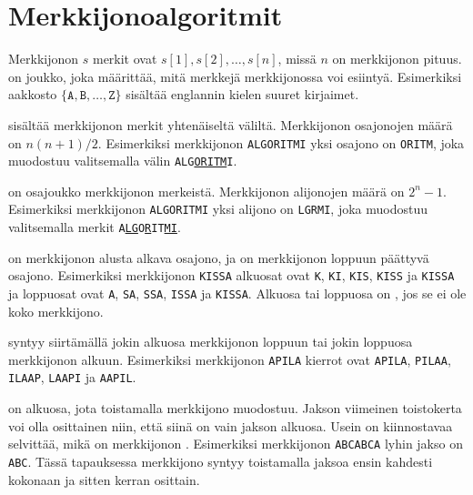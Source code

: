 \chapter{Merkkijonoalgoritmit}


Merkkijonon $s$ merkit ovat $s[1],s[2],\ldots,s[n]$,
missä $n$ on merkkijonon pituus.
 on joukko,
joka määrittää, mitä merkkejä merkkijonossa voi esiintyä.
Esimerkiksi aakkosto $\{\texttt{A},\texttt{B},\ldots,\texttt{Z}\}$
sisältää englannin kielen suuret kirjaimet.


sisältää merkkijonon merkit
yhtenäiseltä väliltä.
Merkkijonon osajonojen määrä on $n(n+1)/2$.
Esimerkiksi merkkijonon \texttt{ALGORITMI}
yksi osajono on \texttt{ORITM},
joka muodostuu valitsemalla välin \texttt{ALG\underline{ORITM}I}.


on osajoukko merkkijonon merkeistä.
Merkkijonon alijonojen määrä on $2^n-1$.
Esimerkiksi merkkijonon \texttt{ALGORITMI}
yksi alijono on \texttt{LGRMI}, joka muodostuu
valitsemalla merkit \texttt{A\underline{LG}O\underline{R}IT\underline{MI}}.


 on merkkijonon
alusta alkava osajono,
ja  on merkkijonon
loppuun päättyvä osajono.
Esimerkiksi merkkijonon \texttt{KISSA}
alkuosat ovat \texttt{K}, \texttt{KI},
\texttt{KIS}, \texttt{KISS} ja \texttt{KISSA}
ja loppuosat ovat \texttt{A}, \texttt{SA},
\texttt{SSA}, \texttt{ISSA} ja \texttt{KISSA}.
Alkuosa tai loppuosa on ,
jos se ei ole koko merkkijono.


 syntyy
siirtämällä jokin alkuosa merkkijonon loppuun
tai jokin loppuosa merkkijonon alkuun.
Esimerkiksi merkkijonon \texttt{APILA}
kierrot ovat
\texttt{APILA},
\texttt{PILAA},
\texttt{ILAAP},
\texttt{LAAPI} ja
\texttt{AAPIL}.


 on alkuosa,
jota toistamalla merkkijono muodostuu.
Jakson viimeinen toistokerta voi olla osittainen
niin, että siinä on vain jakson alkuosa.
Usein on kiinnostavaa selvittää, mikä on merkkijonon
.
Esimerkiksi merkkijonon \texttt{ABCABCA} lyhin jakso on \texttt{ABC}.
Tässä tapauksessa merkkijono syntyy toistamalla jaksoa ensin kahdesti kokonaan
ja sitten kerran osittain.


